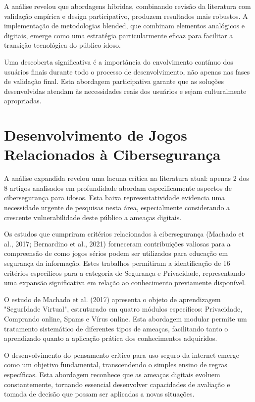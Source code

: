 \begin{table}[H]
A análise revelou que abordagens híbridas, combinando revisão da literatura com validação empírica e design participativo, produzem resultados mais robustos. A implementação de metodologias blended, que combinam elementos analógicos e digitais, emerge como uma estratégia particularmente eficaz para facilitar a transição tecnológica do público idoso.

Uma descoberta significativa é a importância do envolvimento contínuo dos usuários finais durante todo o processo de desenvolvimento, não apenas nas fases de validação final. Esta abordagem participativa garante que as soluções desenvolvidas atendam às necessidades reais dos usuários e sejam culturalmente apropriadas.

\section{Desenvolvimento de Jogos Relacionados à Cibersegurança}
\label{sec:ciberseguranca_expandida}

A análise expandida revelou uma lacuna crítica na literatura atual: apenas 2 dos 8 artigos analisados em profundidade abordam especificamente aspectos de cibersegurança para idosos. Esta baixa representatividade evidencia uma necessidade urgente de pesquisas nesta área, especialmente considerando a crescente vulnerabilidade deste público a ameaças digitais.

Os estudos que cumpriram critérios relacionados à cibersegurança (Machado et al., 2017; Bernardino et al., 2021) forneceram contribuições valiosas para a compreensão de como jogos sérios podem ser utilizados para educação em segurança da informação. Estes trabalhos permitiram a identificação de 16 critérios específicos para a categoria de Segurança e Privacidade, representando uma expansão significativa em relação ao conhecimento previamente disponível.

O estudo de Machado et al. (2017) apresenta o objeto de aprendizagem "SegurIdade Virtual", estruturado em quatro módulos específicos: Privacidade, Comprando online, Spams e Vírus online. Esta abordagem modular permite um tratamento sistemático de diferentes tipos de ameaças, facilitando tanto o aprendizado quanto a aplicação prática dos conhecimentos adquiridos.

O desenvolvimento do pensamento crítico para uso seguro da internet emerge como um objetivo fundamental, transcendendo o simples ensino de regras específicas. Esta abordagem reconhece que as ameaças digitais evoluem constantemente, tornando essencial desenvolver capacidades de avaliação e tomada de decisão que possam ser aplicadas a novas situações.


\end{table}
